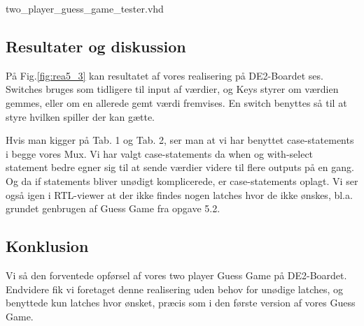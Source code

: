 \documentclass[../journal.tex]{subfiles}
\begin{document}
\begin{table}[H]
    \centering
      \framebox{
        \rule{8pt}{0pt}
          
  }
  \caption{two\_player\_guess\_game\_tester.vhd}	
  \label{src:two_guess_test}
\end{table}


\subsection{Resultater og diskussion}

På Fig.\ref{fig:rea5_3} kan resultatet af vores realisering på DE2-Boardet ses. Switches bruges som tidligere til input af værdier, og Keys styrer om værdien gemmes, eller om en allerede gemt værdi fremvises. En switch benyttes så til at styre hvilken spiller der kan gætte.


Hvis man kigger på Tab. 1 og Tab. 2, ser man at vi har benyttet case-statements i begge vores Mux. Vi har valgt case-statements da when og with-select statement bedre egner sig til at sende værdier videre til flere outputs på en gang. Og da if statements bliver unødigt komplicerede, er case-statements oplagt.\newline
Vi ser også igen i RTL-viewer at der ikke findes nogen latches hvor de ikke ønskes, bl.a. grundet genbrugen af Guess Game fra opgave 5.2.

\subsection{Konklusion}
Vi så den forventede opførsel af vores two player Guess Game på DE2-Boardet. Endvidere fik vi foretaget denne realisering uden behov for unødige latches, og benyttede kun latches hvor ønsket, præcis som i den første version af vores Guess Game.
\end{document}
